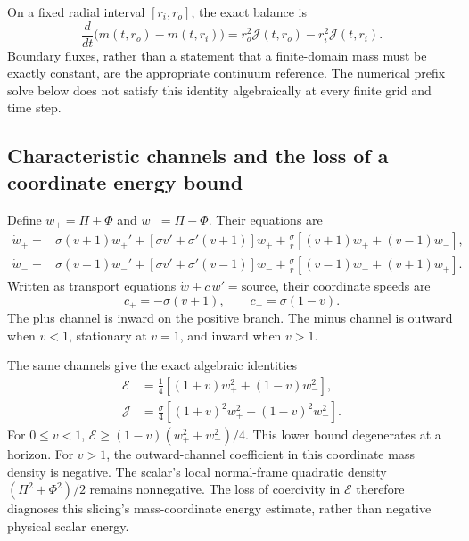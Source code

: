 On a fixed radial interval $[r_i,r_o]$, the exact balance is
\begin{equation}
 \frac{d}{dt}\bigl(m(t,r_o)-m(t,r_i)\bigr)
 =r_o^2\mathcal J(t,r_o)-r_i^2\mathcal J(t,r_i).
\end{equation}
Boundary fluxes, rather than a statement that a finite-domain mass must be exactly constant, are the appropriate continuum reference. The numerical prefix solve below does not satisfy this identity algebraically at every finite grid and time step.

\subsection{Characteristic channels and the loss of a coordinate energy bound}
Define $w_+=\Pi+\Phi$ and $w_-=\Pi-\Phi$. Their equations are
\begin{align}
 \dot w_+={}&\sigma(v+1)w_+'
 +[\sigma v'+\sigma'(v+1)]w_+
 +\frac\sigma r[(v+1)w_++(v-1)w_-],\\
 \dot w_-={}&\sigma(v-1)w_-'
 +[\sigma v'+\sigma'(v-1)]w_-
 +\frac\sigma r[(v-1)w_-+(v+1)w_+].
\end{align}
Written as transport equations $\dot w+c\,w'=\text{source}$, their coordinate speeds are
\begin{equation}
 c_+=-\sigma(v+1),\qquad c_-=\sigma(1-v).
\label{c:strong:characteristics}
\end{equation}
The plus channel is inward on the positive branch. The minus channel is outward when $v<1$, stationary at $v=1$, and inward when $v>1$.

The same channels give the exact algebraic identities
\begin{align}
 \mathcal E&=\frac14[(1+v)w_+^2+(1-v)w_-^2],\\
 \mathcal J&=\frac\sigma4[(1+v)^2w_+^2-(1-v)^2w_-^2].
\label{c:strong:null-energy}
\end{align}
For $0\le v<1$, $\mathcal E\ge(1-v)(w_+^2+w_-^2)/4$. This lower bound degenerates at a horizon. For $v>1$, the outward-channel coefficient in this coordinate mass density is negative. The scalar's local normal-frame quadratic density $(\Pi^2+\Phi^2)/2$ remains nonnegative. The loss of coercivity in $\mathcal E$ therefore diagnoses this slicing's mass-coordinate energy estimate, rather than negative physical scalar energy.


